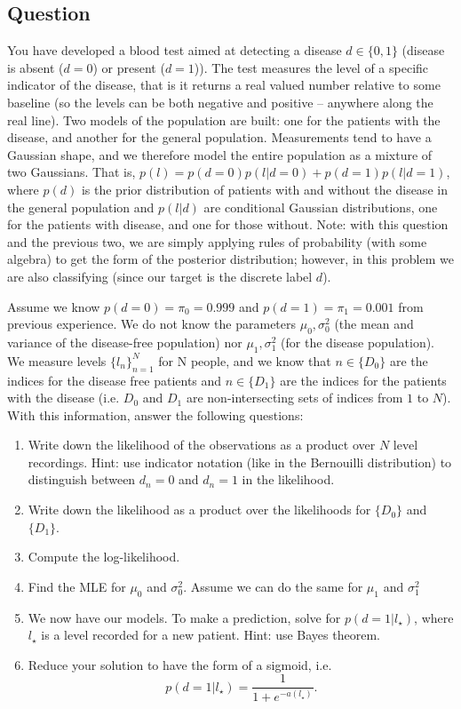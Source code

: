 \documentclass[12pt,a4paper]{article}
\begin{document}
\subsection{Question}
You have developed a blood test aimed at detecting a disease $d \in \{0,1\}$ (disease is absent ($d=0$) or present ($d=1$)).  The test measures the level of a specific indicator of the disease, that is it returns a real valued number relative to some baseline (so the levels can be both negative and positive -- anywhere along the real line).  Two models of the population are built: one for the patients with the disease, and another for the general population.  Measurements tend to have a Gaussian shape, and we therefore model the entire population as a mixture of two Gaussians.  That is, $p( l ) = p(d=0) p( l | d=0 ) + p(d=1) p( l | d=1 )$, where $p(d)$ is the prior distribution of patients with and without the disease in the general population and $p(l|d)$  are conditional Gaussian distributions, one for the patients with disease, and one for those without.  Note: with this question and the previous two, we are simply applying rules of probability (with some algebra) to get the form of the posterior distribution; however, in this problem we are also classifying (since our target is the discrete label $d$).

Assume we know $p(d=0) = \pi_0 = 0.999$ and $p(d=1) = \pi_1 = 0.001$ from previous experience.  We do not know the parameters $\mu_0, \sigma_0^2$ (the mean and variance of the disease-free population) nor $\mu_1, \sigma_1^2$ (for the disease population).  We measure levels $\{ l_n\}_{n=1}^N$ for N people, and we know that $n\in\{D_0\}$ are the indices for the disease free patients and $n\in\{D_1\}$ are the indices for the patients with the disease (i.e. $D_0$ and $D_1$ are non-intersecting sets of indices from $1$ to $N$).  With this information, answer the following questions:
\begin{enumerate}
  \item Write down the likelihood of the observations as a product over $N$ level recordings.  Hint: use indicator notation (like in the Bernouilli distribution) to distinguish between $d_n=0$ and $d_n=1$ in the likelihood.
  \item Write down the likelihood as a product over the likelihoods for $\{D_0\}$ and $\{D_1\}$.
  \item Compute the log-likelihood.
  \item Find the MLE for $\mu_0$ and $\sigma_0^2$.  Assume we can do the same for $\mu_1$ and $\sigma_1^2$
  \item We now have our models.  To make a prediction, solve for $p( d=1 | l_{\star})$, where $l_{\star}$ is a level recorded for a new patient.  Hint: use Bayes theorem.
  \item Reduce your solution to have the form of a sigmoid, i.e. 
      \begin{equation*}
         p(d=1|l_{\star}) = \frac{1}{1+e^{-a(l_{\star})}}.
      \end{equation*}
  
\end{enumerate}
\end{document}

